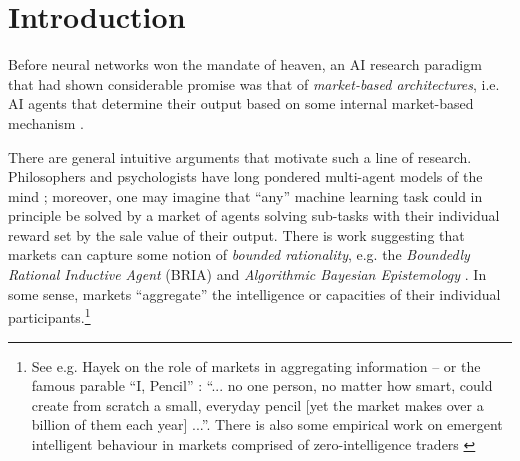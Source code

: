 \section{Introduction}

Before neural networks won the mandate of heaven, an AI research paradigm that had shown considerable promise was that of \emph{market-based architectures}, i.e. AI agents that determine their output based on some internal market-based mechanism \cite{kweeMarketBasedReinforcementLearning2001, changDecentralizedReinforcementLearning2020}.

There are general intuitive arguments that motivate such a line of research. Philosophers and psychologists have long pondered multi-agent models of the mind \cite{minskySocietyMind1988}; moreover, one may imagine that ``any'' machine learning task could in principle be solved by a market of agents solving sub-tasks with their individual reward set by the sale value of their output. There is work suggesting that markets can capture some notion of \emph{bounded rationality}, e.g. the \emph{Boundedly Rational Inductive Agent} (BRIA) \cite{oesterheldTheoryBoundedInductive2023} and \emph{Algorithmic Bayesian Epistemology} \cite{neymanAlgorithmicBayesianEpistemology2024}. In some sense, markets ``aggregate'' the intelligence or capacities of their individual participants.\footnote{See e.g. Hayek on the role of markets in aggregating information \cite{hayekEconomicsKnowledge1937} -- or the famous parable ``I, Pencil'' \cite{leonardereadPencilMyFamily1958}: ``... no one person, no matter how smart, could create from scratch a small, everyday pencil [yet the market makes over a billion of them each year] ...''. There is also some empirical work on emergent intelligent behaviour in markets comprised of zero-intelligence traders \cite{godeAllocativeEfficiencyMarkets1993, schwartzHowMuchIrrationality2008, jamalSimpleAgentsIntelligent2015}}


